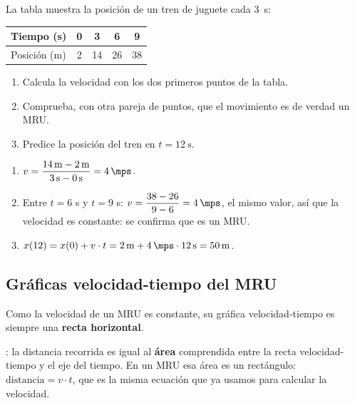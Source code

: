 \begin{exercise}
    La tabla muestra la posición de un tren de juguete cada \qty{3}{\s}:
    \begin{center}
        \begin{tabular}{lcccc}
            \toprule
            Tiempo (s) & 0 & 3 & 6 & 9 \\
            \midrule
            Posición (m) & 2 & 14 & 26 & 38 \\
            \bottomrule
        \end{tabular}
    \end{center}
    \begin{enumerate}[label=\letraminuscula]
        \item Calcula la velocidad con los dos primeros puntos de la tabla.
        \item Comprueba, con otra pareja de puntos, que el movimiento es de verdad un MRU.
        \item Predice la posición del tren en \(t=\qty{12}{\s}\).
    \end{enumerate}
    \begin{solu}
        \begin{enumerate}[label=\alph*)]
            \item \(v = \dfrac{\qty{14}{\m} - \qty{2}{\m}}{\qty{3}{\s} - \qty{0}{\s}} = \qty{4}{\mps}\).
            \item Entre \(t=6\) s y \(t=9\) s: \(v = \dfrac{38-26}{9-6} = \qty{4}{\mps}\), el mismo valor, así que la velocidad es constante: se confirma que es un MRU.
            \item \(x(12) = x(0) + v \cdot t = \qty{2}{\m} + \qty{4}{\mps} \cdot \qty{12}{\s} = \qty{50}{\m}\).
        \end{enumerate}
    \end{solu}
\end{exercise}

\subsection{Gráficas velocidad-tiempo del MRU}

Como la velocidad de un MRU es constante, su gráfica velocidad-tiempo es siempre una \textbf{recta horizontal}.

\begin{impt}
    : la distancia recorrida es igual al \textbf{área} comprendida entre la recta velocidad-tiempo y el eje del tiempo. En un MRU esa área es un rectángulo: \(\text{distancia} = v \cdot t\), que es la misma ecuación que ya usamos para calcular la velocidad.
\end{impt}


